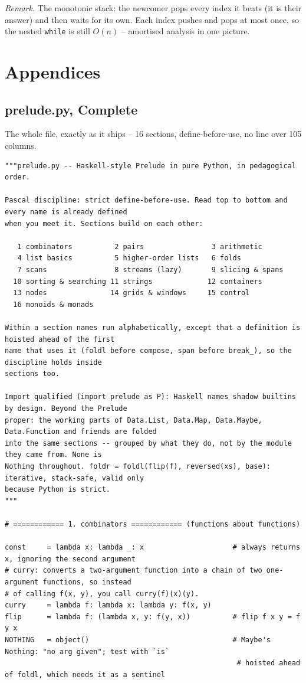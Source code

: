 \documentclass[11pt,letterpaper]{book}
\begin{document}
\noindent\textit{Remark.} The monotonic stack: the newcomer pops every index it
beats (it is their answer) and then waits for its own. Each index pushes and
pops at most once, so the nested \texttt{while} is still $O(n)$ -- amortised
analysis in one picture.
\appendix
\part{Appendices}
\chapter{prelude.py, Complete}
The whole file, exactly as it ships -- 16 sections, define-before-use,
no line over 105 columns.
\begin{lstlisting}[style=file]
"""prelude.py -- Haskell-style Prelude in pure Python, in pedagogical order.

Pascal discipline: strict define-before-use. Read top to bottom and every name is already defined
when you meet it. Sections build on each other:

   1 combinators          2 pairs                3 arithmetic
   4 list basics          5 higher-order lists   6 folds
   7 scans                8 streams (lazy)       9 slicing & spans
  10 sorting & searching 11 strings             12 containers
  13 nodes               14 grids & windows     15 control
  16 monoids & monads

Within a section names run alphabetically, except that a definition is hoisted ahead of the first
name that uses it (foldl before compose, span before break_), so the discipline holds inside
sections too.

Import qualified (import prelude as P): Haskell names shadow builtins by design. Beyond the Prelude
proper: the working parts of Data.List, Data.Map, Data.Maybe, Data.Function and friends are folded
into the same sections -- grouped by what they do, not by the module they came from. None is
Nothing throughout. foldr = foldl(flip(f), reversed(xs), base): iterative, stack-safe, valid only
because Python is strict.
"""

# ============ 1. combinators ============ (functions about functions)

const     = lambda x: lambda _: x                     # always returns x, ignoring the second argument
# curry: converts a two-argument function into a chain of two one-argument functions, so instead
# of calling f(x, y), you call curry(f)(x)(y).
curry     = lambda f: lambda x: lambda y: f(x, y)
flip      = lambda f: (lambda x, y: f(y, x))          # flip f x y = f y x
NOTHING   = object()                                  # Maybe's Nothing: "no arg given"; test with `is`
                                                       # hoisted ahead of foldl, which needs it as a sentinel


\end{lstlisting}
\end{document}
